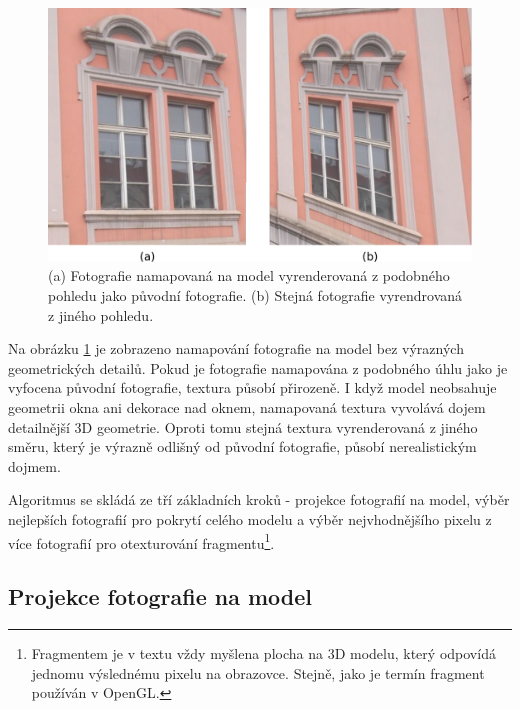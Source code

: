 \documentclass[11pt,twoside,a4paper]{book}
\begin{document}
\begin{figure}[t]
\begin{center}
\includegraphics[width=\textwidth]{figures/faust}
\caption{(a) Fotografie namapovaná na model vyrenderovaná z podobného pohledu jako původní fotografie. (b) Stejná fotografie vyrendrovaná z jiného pohledu.}
\label{fig:faust}
\end{center}
\end{figure}

Na obrázku \ref{fig:faust} je zobrazeno namapování fotografie na model bez výrazných geometrických detailů. Pokud je fotografie namapována z podobného úhlu jako je vyfocena původní fotografie, textura působí přirozeně. I když model neobsahuje geometrii okna ani dekorace nad oknem, namapovaná textura vyvolává dojem detailnější 3D geometrie. Oproti tomu stejná textura vyrenderovaná z jiného směru, který je výrazně odlišný od původní fotografie, působí nerealistickým dojmem.


Algoritmus se skládá ze tří základních kroků - projekce fotografií na model, výběr nejlepších fotografií pro pokrytí celého modelu a výběr nejvhodnějšího pixelu z více fotografií pro otexturování fragmentu\footnote{Fragmentem je v textu vždy myšlena plocha na 3D modelu, který odpovídá jednomu výslednému pixelu na obrazovce. Stejně, jako je termín fragment používán v OpenGL.}.

\subsection{Projekce fotografie na model}
\label{sec:matice-kamery}
\end{document}
